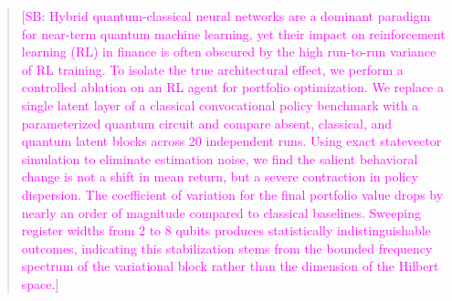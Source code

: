 \documentclass[aps,floatfix,superscriptaddress,twocolumn,tightenlines,amsmath,amssymb,nofootinbib,10pt,longbibliography,prl]{revtex4-2}
\newcommand{\sam}[1]{\textcolor{magenta}{[SB: {#1}]}}
\begin{document}
\date{\today}
\begin{abstract}

\sam{Hybrid quantum-classical neural networks are a dominant paradigm for near-term quantum machine learning, yet their impact on reinforcement learning (RL) in finance is often obscured by the high run-to-run variance of RL training. To isolate the true architectural effect, we perform a controlled ablation on an RL agent for portfolio optimization. We replace a single latent layer of a classical convocational policy benchmark with a parameterized quantum circuit and compare absent, classical, and quantum latent blocks across 20 independent runs. Using exact statevector simulation to eliminate estimation noise, we find the salient behavioral change is not a shift in mean return, but a severe contraction in policy dispersion. The coefficient of variation for the final portfolio value drops by nearly an order of magnitude compared to classical baselines. Sweeping register widths from 2 to 8 qubits produces statistically indistinguishable outcomes, indicating this stabilization stems from the bounded frequency spectrum of the variational block rather than the dimension of the Hilbert space.} %
\end{abstract}
\end{document}
